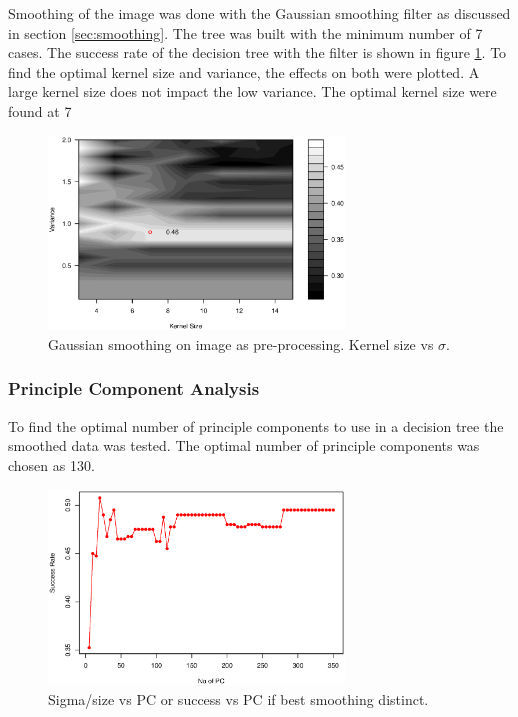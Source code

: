 Smoothing of the image was done with the Gaussian smoothing filter as discussed in section \ref{sec:smoothing}.
The tree was built with the minimum number of 7 cases.
The success rate of the decision tree with the filter is shown in figure \ref{fig:tree_smooth}.
To find the optimal kernel size and variance, the effects on both were plotted.
A large kernel size does not impact the low variance. The optimal kernel size were found at    7

\begin{figure}[H]
\centering
\includegraphics[width=0.7\textwidth]{graphics/tree_smooth}
\caption[Success for decision tree with smoothing.]{Gaussian smoothing on image as pre-processing. Kernel size vs $\sigma$. }%
\label{fig:tree_smooth}
\end{figure}

\subsubsection{Principle Component Analysis}

To find the optimal number of principle components to use in a decision tree 
the smoothed data 
was tested.
The optimal number of principle components was chosen as 130.

\begin{figure}[H]
\centering
\includegraphics[width=0.7\textwidth]{graphics/tree_pca}
\caption[Success for decision tree with smoothing and PCA.]{Sigma/size vs PC or success vs PC if best smoothing distinct.}
\end{figure}


